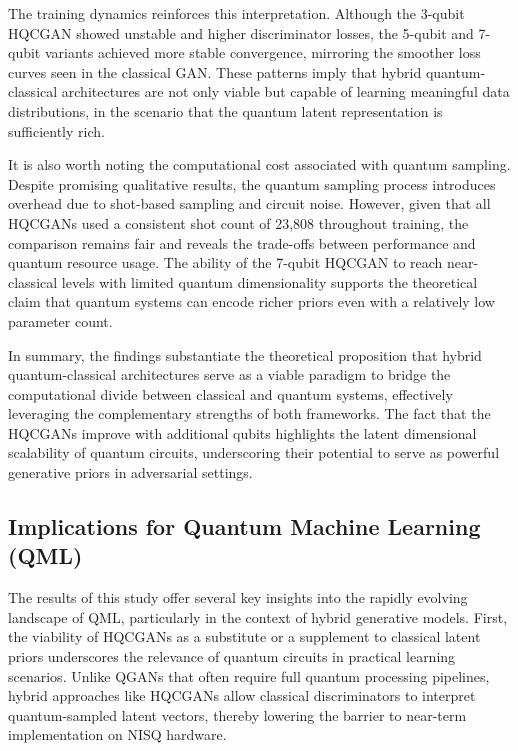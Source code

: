 \documentclass[conference]{IEEEtran}
\begin{document}
The training dynamics reinforces this interpretation. Although the 3-qubit HQCGAN showed unstable and higher discriminator losses, the 5-qubit and 7-qubit variants achieved more stable convergence, mirroring the smoother loss curves seen in the classical GAN. These patterns imply that hybrid quantum-classical architectures are not only viable but capable of learning meaningful data distributions, in the scenario that the quantum latent representation is sufficiently rich.

It is also worth noting the computational cost associated with quantum sampling. Despite promising qualitative results, the quantum sampling process introduces overhead due to shot-based sampling and circuit noise. However, given that all HQCGANs used a consistent shot count of 23,808 throughout training, the comparison remains fair and reveals the trade-offs between performance and quantum resource usage. The ability of the 7-qubit HQCGAN to reach near-classical levels with limited quantum dimensionality supports the theoretical claim that quantum systems can encode richer priors even with a relatively low parameter count.

In summary, the findings substantiate the theoretical proposition that hybrid quantum-classical architectures serve as a viable paradigm to bridge the computational divide between classical and quantum systems, effectively leveraging the complementary strengths of both frameworks. The fact that the HQCGANs improve with additional qubits highlights the latent dimensional scalability of quantum circuits, underscoring their potential to serve as powerful generative priors in adversarial settings.

\subsection{Implications for Quantum Machine Learning (QML)}

The results of this study offer several key insights into the rapidly evolving landscape of QML, particularly in the context of hybrid generative models. First, the viability of HQCGANs as a substitute or a supplement to classical latent priors underscores the relevance of quantum circuits in practical learning scenarios. Unlike QGANs that often require full quantum processing pipelines, hybrid approaches like HQCGANs allow classical discriminators to interpret quantum-sampled latent vectors, thereby lowering the barrier to near-term implementation on NISQ hardware.
\end{document}
